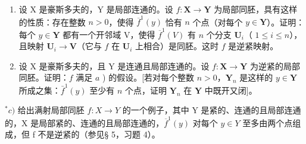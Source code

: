\begin{enumerate}
\def\labelenumi{\alph{enumi})}
\item
  设 X 是豪斯多夫的，Y 是局部连通的。设 \(f: \mathbf{X} \to \mathbf{Y}\) 为局部同胚，具有这样的性质：存在整数 \(n > 0\)，使得 \(\overline{f}^1(y)\) 恰有 \(n\) 个点（对每个 \(y \in \mathbf{Y}\)）。证明：每个 \(y \in \mathbf{Y}\) 都有一个开邻域 V，使得 \(\overline{f}^1(V)\) 有 \(n\) 个分支 \(\mathbf{U}_i\)（ \(1 \leqslant i \leqslant n\)），且映射 \(\mathbf{U}_i \to \mathbf{V}\)（它与 \(f\) 在 \(\mathbf{U}_i\) 上相合）是同胚。这时 \(f\) 是逆紧映射。
\item
  设 X 是豪斯多夫的，且 Y 是连通且局部连通的。设 \(f: \mathbf{X} \to \mathbf{Y}\) 为逆紧的局部同胚。证明：\(f\) 满足 \(a\) ) 的假设。{[}若对每个整数 \(n > 0\)，\(\mathbf{Y}_n\) 是这样的 \(y \in \mathbf{Y}\) 所成之集：\(\bar{f}^1(y)\) 至少有 \(n\) 个点，证明 \(\mathbf{Y}_n\) 在 \(\mathbf{Y}\) 中既开又闭{]}。
\end{enumerate}

\(^{*}c)\) 给出满射局部同胚 \(f: X \to Y\) 的一个例子，其中 Y 是紧的、连通的且局部连通的，X 是局部紧的、连通的且局部连通的，\(\overline{f}^{1}(y)\) 对每个 \(y \in Y\) 至多由两个点组成，但 f 不是逆紧的（参见§ 5，习题 4）。
